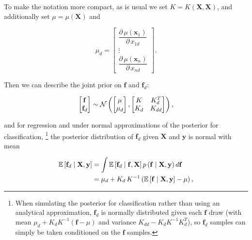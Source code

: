\documentclass{draft}
\newcommand{\pd}{\ensuremath{\partial \,}}     %
\newcommand{\gradient}{\ensuremath{\mathbf{f}_d}} %
\begin{document}
To make the notation more compact, as is usual we set \( K = K \left( \mathbf{X}, \mathbf{X} \right) \), 
and additionally set \( \mu = \mu \left( \mathbf{X} \right) \)
and

\begin{equation}
    \mu_d
    =
    \begin{bmatrix}
        \dfrac{\pd \mu \left( \mathbf{x}_1 \right)}{\pd x_{1d}} \\
        \vdots \\
        \dfrac{\pd \mu \left( \mathbf{x}_n \right)}{\pd x_{nd}}
    \end{bmatrix}.
\end{equation}

Then we can describe the joint prior on \( \mathbf{f} \) and \( \gradient \):

\vspace*{-\baselineskip}
\begin{align}
    \begin{bmatrix}
        \mathbf{f} \\
        \gradient
    \end{bmatrix}
    \sim
    \N
    \left(
        \begin{bmatrix}
            \mu \\
            \mu_d
        \end{bmatrix},
        \begin{bmatrix}
            K   & K_d^T \\
            K_d & K_{dd}
        \end{bmatrix}
    \right),
\end{align}

\noindent
and for regression and under normal approximations of the posterior for classification,%
\footnote{
    When simulating the posterior for classification rather than using an analytical approximation,
    \( \mathbf{f}_d \) is normally distributed given each \( \mathbf{f} \) draw
    (with mean \( \mu_d + K_d K^{-1} \left( \mathbf{f} - \mu \right) \)
    and variance \( K_{dd} - K_d K^{-1} K_d^T \)),
    so \( \mathbf{f}_d \) samples can simply be taken conditioned on the \( \mathbf{f} \) samples.
}
the posterior distribution of \( \gradient \) given \( \mathbf{X} \) and \( \mathbf{y} \) is normal with mean

\vspace*{-\baselineskip}
\begin{align}
    \E \left[ \gradient \mid \mathbf{X}, \mathbf{y} \right]
    & =
    \int \E \left[ \gradient \mid \mathbf{f}, \mathbf{X} \right] p \left( \mathbf{f} \mid \mathbf{X}, \mathbf{y} \right) d\mathbf{f}
    \nonumber \\
    & =  \mu_d + K_d \, K^{-1} \left( \E \left[ \mathbf{f} \mid \mathbf{X}, \mathbf{y} \right] - \mu \right),
\end{align}
\end{document}
